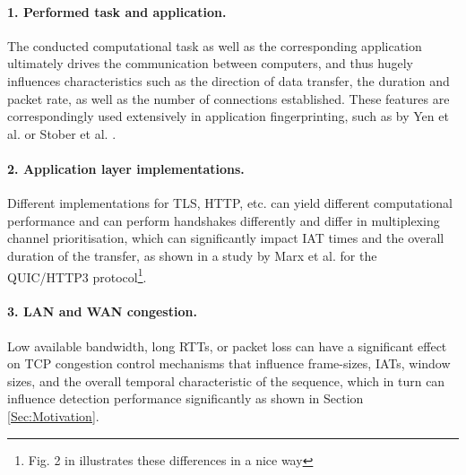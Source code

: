 \documentclass[runningheads]{llncs}
\begin{document}
\paragraph{1. Performed task and application.}
The conducted computational task as well as the corresponding application ultimately drives the communication between computers, and thus hugely influences characteristics such as the direction of data transfer, the duration and packet rate, as well as the number of connections established. These features are correspondingly used extensively in application fingerprinting, such as by Yen et al. \cite{yen2009browser} or Stober et al. \cite{stober2013you}. %



\paragraph{2. Application layer implementations.}
Different implementations for TLS, HTTP, etc. can yield different computational performance and can perform handshakes differently and differ in multiplexing channel prioritisation, which can significantly impact IAT times and the overall duration of the transfer, as shown in a study by Marx et al. \cite{marx2020same} for the QUIC/HTTP3 protocol\footnote{Fig. 2 in \cite{marx2020same} illustrates these differences in a nice way}. 


\paragraph{3. LAN and WAN congestion.}
Low available bandwidth, long RTTs, or packet loss can have a significant effect on TCP congestion control mechanisms that influence frame-sizes, IATs, window sizes, and the overall temporal characteristic of the sequence, which in turn can influence detection performance significantly as shown in Section \ref{Sec:Motivation}.
\end{document}
